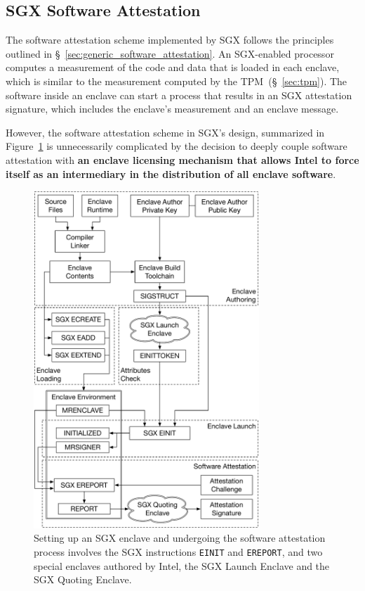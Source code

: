 \subsection{SGX Software Attestation}
\label{sec:sgx_attestation}

The software attestation scheme implemented by SGX follows the principles
outlined in \S~\ref{sec:generic_software_attestation}. An SGX-enabled processor
computes a measurement of the code and data that is loaded in each enclave,
which is similar to the measurement computed by the TPM~(\S~\ref{sec:tpm}). The
software inside an enclave can start a process that results in an SGX
attestation signature, which includes the enclave's measurement and an enclave
message.

However, the software attestation scheme in SGX's design, summarized in
Figure~\ref{fig:sgx_attestation_overview} is unnecessarily complicated by the
decision to deeply couple software attestation with
\textbf{an enclave licensing mechanism that allows Intel to force itself as an
intermediary in the distribution of all enclave software}.

\begin{figure}[hbt]
  \centering
  \includegraphics[width=85mm]{figures/sgx_attestation_overview.pdf}
  \caption{
    Setting up an SGX enclave and undergoing the software attestation process
    involves the SGX instructions \texttt{EINIT} and \texttt{EREPORT}, and two
    special enclaves authored by Intel, the SGX Launch Enclave and the SGX
    Quoting Enclave.
  }
  \label{fig:sgx_attestation_overview}
\end{figure}

